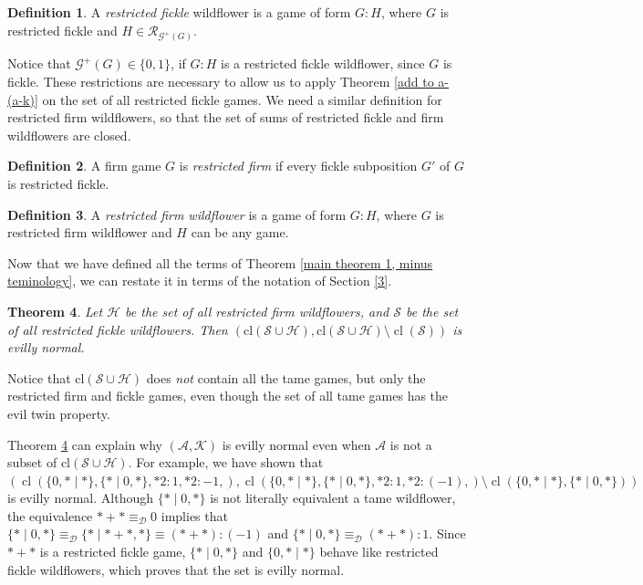 \documentclass{amsart}
\theoremstyle{plain}
\newtheorem{thm}{Theorem}
\theoremstyle{definition}
\newtheorem{defn}[thm]{Definition}
\theoremstyle{remark}
\numberwithin{equation}{section}
\numberwithin{thm}{section}
\DeclareMathOperator{\cl}{cl}
\begin{document}
\begin{defn}
    A \emph{restricted fickle} wildflower is a game of form $G: H$, where $G$ is restricted fickle and $H \in \mathscr{R}_{\mathcal{G}^+(G)}$.
\end{defn}

Notice that $\mathcal{G}^+(G) \in \{0,1\}$, if $G:H$ is a restricted fickle wildflower, since $G$ is fickle.
These restrictions are necessary to allow us to apply Theorem \ref{add to a- (a-k)} on the set of all restricted fickle games.
We need a similar definition for restricted firm wildflowers, so that the set of sums of restricted fickle and firm wildflowers are closed.

\begin{defn}
    A firm game $G$ is \emph{restricted firm} if every fickle subposition $G'$ of $G$ is restricted fickle.
\end{defn}

\begin{defn}
     A \emph{restricted firm wildflower} is a game of form $G: H$, where $G$ is restricted firm wildflower and $H$ can be any game.
\end{defn}


Now that we have defined all the terms of Theorem \ref{main theorem 1, minus teminology}, we can restate it in terms of the notation of Section \ref{3}.
\begin{thm}
\label{big}
 Let $\mathscr{H}$ be the set of all restricted firm wildflowers, and $\mathscr{S}$ be the set of all restricted fickle wildflowers. Then $(\text{cl}(\mathscr{S} \cup \mathscr{H}),\text{cl}(\mathscr{S} \cup \mathscr{H}) \setminus \cl(\mathscr{S}))$ is evilly normal.
\end{thm}
Notice that $\text{cl}(\mathscr{S} \cup \mathscr{H})$ does \emph{not} contain all the tame games, but only the restricted firm and fickle games, even though the set of all tame games has the evil twin property.

Theorem \ref{big} can explain why $(\mathscr{A},\mathscr{K})$ is evilly normal even when $\mathscr{A}$ is not a subset of $\text{cl}(\mathscr{S} \cup \mathscr{H})$. For example, we have shown that $(\cl (\{0,* \mid *\} , \{*\mid 0,*\}, *2:1, *2:-1 ,), \cl (\{0,* \mid *\} , \{*\mid 0,*\}, *2:1, *2:(-1),) \setminus \cl (\{0,* \mid *\} , \{*\mid 0,*\}))$ is evilly normal. Although $\{ *\mid 0,*\}$ is not literally equivalent a tame wildflower, the equivalence $*+* \equiv_{\mathcal{D}} 0$ implies that $\{*\mid0,*\} \equiv_{\mathcal{D}}\{*\mid*+*,*\} \equiv (*+*):(-1) $ and $\{*\mid0,*\} \equiv_{\mathcal{D}} (*+*):1$. Since $*+*$ is a restricted fickle game, $\{*\mid 0,*\}$ and $\{0,*\mid*\}$ behave like restricted fickle wildflowers, which proves that the set is evilly normal.
\end{document}
